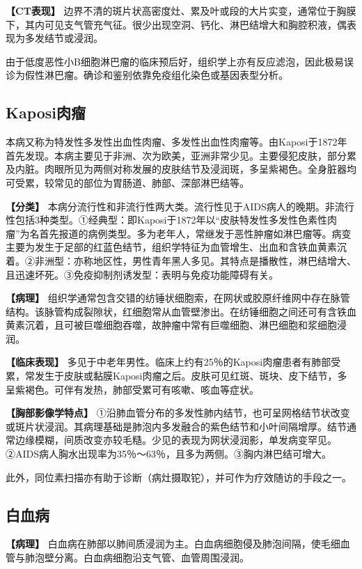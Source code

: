 \textbf{【CT表现】}
边界不清的斑片状高密度灶、累及叶或段的大片实变，通常位于胸膜下，其内可见支气管充气征。很少出现空洞、钙化、淋巴结增大和胸腔积液，偶表现为多发结节或浸润。

由于低度恶性小B细胞淋巴瘤的临床预后好，组织学上亦有反应滤泡，因此极易误诊为假性淋巴瘤。确诊和鉴别依靠免疫组化染色或基因表型分析。

\subsection{Kaposi肉瘤}

本病又称为特发性多发性出血性肉瘤、多发性出血性肉瘤等。由Kaposi于1872年首先发现。本病主要见于非洲、次为欧美，亚洲非常少见。主要侵犯皮肤，部分累及内脏。肉眼所见为两侧对称发展的皮肤结节及浸润斑，多呈紫褐色。全身脏器均可受累，较常见的部位为胃肠道、肺部、深部淋巴结等。

\textbf{【分类】}
本病分流行性和非流行性两大类。流行性见于AIDS病人的晚期。非流行性包括3种类型。①经典型：即Kaposi于1872年以“皮肤特发性多发性色素性肉瘤”为名首先报道的病例类型。多为老年人，常继发于恶性肿瘤如淋巴瘤等。病变主要为发生于足部的红蓝色结节，组织学特征为血管增生、出血和含铁血黄素沉着。②非洲型：亦称地区性，男性青年黑人多见。其特点是播散性，淋巴结增大、且迅速坏死。③免疫抑制剂诱发型：表明与免疫功能障碍有关。

\textbf{【病理】}
组织学通常包含交错的纺锤状细胞索，在网状或胶原纤维网中存在脉管结构。该脉管构成裂隙状，红细胞常从血管壁渗出。在纺锤细胞之间还可有含铁血黄素沉着，且可被巨噬细胞吞噬，故肿瘤中常有巨噬细胞、淋巴细胞和浆细胞浸润。

\textbf{【临床表现】}
多见于中老年男性。临床上约有25％的Kaposi肉瘤患者有肺部受累，常发生于皮肤或黏膜Kaposi肉瘤之后。皮肤可见红斑、斑块、皮下结节，多呈紫褐色。可伴有发热，肺部受累可有咳嗽、咳血等症状。

\textbf{【胸部影像学特点】}
①沿肺血管分布的多发性肺内结节，也可呈网格结节状改变或斑片状浸润。其病理基础是肺泡内多发融合的紫色结节和小叶间隔增厚。结节通常边缘模糊，间质改变亦较毛糙。少见的表现为网状浸润影，单发病变罕见。②AIDS病人胸水出现率为35％～63％，且多为两侧。③胸内淋巴结可增大。

此外，同位素扫描亦有助于诊断（病灶摄取铊），并可作为疗效随访的手段之一。

\subsection{白血病}

\textbf{【病理】}
白血病在肺部以肺间质浸润为主。白血病细胞侵及肺泡间隔，使毛细血管与肺泡壁分离。白血病细胞沿支气管、血管周围浸润。

